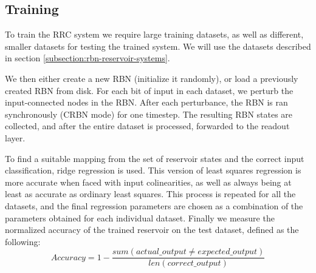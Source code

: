 \subsection{Training}

To train the RRC system we require large training datasets,
as well as different, smaller datasets for testing the trained system.
We will use the datasets described in section \ref{subsection:rbn-reservoir-systems}.

We then either create a new RBN (initialize it randomly),
or load a previously created RBN from disk.
For each bit of input in each dataset,
we perturb the input-connected nodes in the RBN.
After each perturbance, the RBN is ran synchronously (CRBN mode) for one timestep.
The resulting RBN states are collected,
and after the entire dataset is processed,
forwarded to the readout layer.

To find a suitable mapping from the set of reservoir states and the correct input classification,
ridge regression \cite{hoerl1970ridge} is used.
This version of least squares regression is more accurate when faced with input colinearities, as well as always being at least as accurate as ordinary least squares.  
This process is repeated for all the datasets,
and the final regression parameters are chosen as a combination of the parameters obtained for each individual dataset.
Finally we measure the normalized accuracy of the trained reservoir on the test dataset,
defined as the following:
\begin{equation}
Accuracy = 1 - \dfrac{sum(actual\_output \neq expected\_output)}{len(correct\_output)}
\label{formula:accuracy}
\end{equation}
